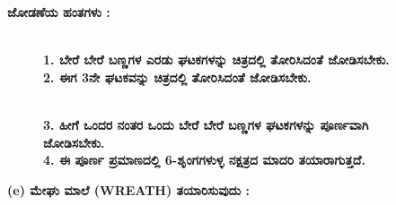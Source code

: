  \noindent
 \textbf{ಜೋಡಣೆಯ ಹಂತಗಳು :}
 \begin{figure}[H]
\\
\textbf{1. ಬೇರೆ ಬೇರೆ ಬಣ್ಣಗಳ ಎರಡು ಘಟಕಗಳನ್ನು ಚಿತ್ರದಲ್ಲಿ ತೋರಿಸಿದಂತೆ ಜೋಡಿಸಬೇಕು.}\\
\textbf{2. ಈಗ 3ನೇ ಘಟಕವನ್ನು ಚಿತ್ರದಲ್ಲಿ ತೋರಿಸಿದಂತೆ ಜೋಡಿಸಬೇಕು.}
\end{figure}
 \begin{figure}[H]
\\
\textbf{3. ಹೀಗೆ ಒಂದರ ನಂತರ ಒಂದು ಬೇರೆ ಬೇರೆ ಬಣ್ಣಗಳ ಘಟಕಗಳನ್ನು ಪೂರ್ಣವಾಗಿ ಜೋಡಿಸಬೇಕು.}\\
\textbf{4. ಈ ಪೂರ್ಣ ಪ್ರಮಾಣದಲ್ಲಿ 6-ಶೃಂಗಗಳುಳ್ಳ ನಕ್ಷತ್ರದ ಮಾದರಿ ತಯಾರಾಗುತ್ತದೆ.}
\end{figure}

\eject

\noindent
\textbf{(e) ಮೇಘು ಮಾಲೆ (WREATH) ತಯಾರಿಸುವುದು :}   

